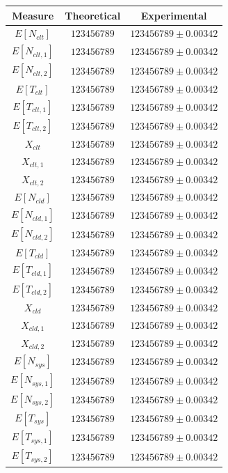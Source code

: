 \begin{figure}
	\begin{center}
		\begin{tabular}{|c||c|c|}
			\hline
			Measure & Theoretical & Experimental\\
			\hline
			$E[N_{clt}]$  & $123456789$ & $123456789\pm 0.00342$ \\
			$E[N_{clt,1}]$  & $123456789$ & $123456789\pm 0.00342$ \\
			$E[N_{clt,2}]$  & $123456789$ & $123456789\pm 0.00342$ \\
			$E[T_{clt}]$  & $123456789$ & $123456789\pm 0.00342$ \\
			$E[T_{clt,1}]$  & $123456789$ & $123456789\pm 0.00342$ \\
			$E[T_{clt,2}]$  & $123456789$ & $123456789\pm 0.00342$ \\
			$X_{clt}$  & $123456789$ & $123456789\pm 0.00342$ \\
			$X_{clt,1}$  & $123456789$ & $123456789\pm 0.00342$ \\
			$X_{clt,2}$  & $123456789$ & $123456789\pm 0.00342$ \\
			\hline
			$E[N_{cld}]$  & $123456789$ & $123456789\pm 0.00342$ \\
			$E[N_{cld,1}]$  & $123456789$ & $123456789\pm 0.00342$ \\
			$E[N_{cld,2}]$  & $123456789$ & $123456789\pm 0.00342$ \\
			$E[T_{cld}]$  & $123456789$ & $123456789\pm 0.00342$ \\
			$E[T_{cld,1}]$  & $123456789$ & $123456789\pm 0.00342$ \\
			$E[T_{cld,2}]$  & $123456789$ & $123456789\pm 0.00342$ \\
			$X_{cld}$  & $123456789$ & $123456789\pm 0.00342$ \\
			$X_{cld,1}$  & $123456789$ & $123456789\pm 0.00342$ \\
			$X_{cld,2}$  & $123456789$ & $123456789\pm 0.00342$ \\
			\hline
			$E[N_{sys}]$  & $123456789$ & $123456789\pm 0.00342$ \\
			$E[N_{sys,1}]$  & $123456789$ & $123456789\pm 0.00342$ \\
			$E[N_{sys,2}]$  & $123456789$ & $123456789\pm 0.00342$ \\
			$E[T_{sys}]$  & $123456789$ & $123456789\pm 0.00342$ \\
			$E[T_{sys,1}]$  & $123456789$ & $123456789\pm 0.00342$ \\
			$E[T_{sys,2}]$  & $123456789$ & $123456789\pm 0.00342$ \\

\end{tabular}
\end{center}
\end{figure}
